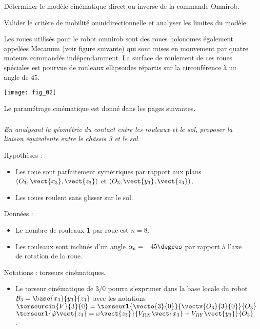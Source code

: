 \ifprof
\else
\begin{multicols}{2}
\fi

\begin{obj}
Déterminer le modèle cinématique direct ou inverse de la commande Omnirob. 

Valider le critère de mobilité omnidirectionnelle et analyser les limites du modèle.
\end{obj}


Les roues utilisés pour le robot omnirob sont des roues holonomes  également appelées Mecanum (voir figure suivante) qui sont mises en mouvement par quatre moteurs commandés indépendamment. La surface de roulement de ces roues spéciales est pourvue de rouleaux ellipsoïdes répartis sur la circonférence à un angle de 45\degres. 



\begin{center}
\texttt{[image: fig\_02]}
\end{center}


Le paramétrage cinématique est donné dans les pages suivantes. 

\subparagraph{}
\textit{En analysant la géométrie du contact entre les rouleaux et le sol, proposer la liaison équivalente entre le châssis 3 et le sol.}
\ifprof%
\begin{corrige}
\end{corrige}\else\fi

Hypothèses : 
\begin{itemize}
\item Les roue sont parfaitement symétriques par rapport aux plans $\left(O_3,\vect{x_3},\vect{z_3}\right)$
et $\left(O_3,\vect{y_3},\vect{z_3}\right)$.
\item Les roues roulent sans glisser sur le sol.
\end{itemize}

Données : 
\begin{itemize}
\item Le nombre de rouleaux \textbf{1} par roue est $n=8$. 
\item Les rouleaux sont inclinés d'un angle $\alpha_a=-45\degres$ par rapport à l'axe de rotation de la roue.
\end{itemize}

Notations : torseurs cinématiques.
\begin{itemize}
\item Le torseur cinématique de 3/0 pourra s'exprimer dans la base locale du robot $\mathcal{B}_3 = \base{x_3}{y_3}{z_3}$ avec les notations $\torseurcin{V}{3}{0} = \torseurl{\vecto{3}{0}}{\vectv{O_3}{3}{0}}{O_3}$
$\torseurl{\dot{\varphi}\vect{z_3}=\omega \vect{z_3}}{V_{RX}\vect{x_3}+V_{RY}\vect{y_3}}{O_3}$.
\end{itemize}


\end{multicols}
